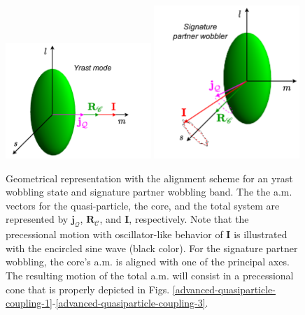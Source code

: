 \begin{figure}
    \centering
    \includegraphics[width=0.49\textwidth]{Chapters/Figures/yrast_wobbler-schematic.pdf}
    \includegraphics[width=0.49\textwidth]{Chapters/Figures/signaturePartner_wobbler-schematic.pdf}
    \caption{Geometrical representation with the alignment scheme for an yrast wobbling state and signature partner wobbling band. The the a.m. vectors for the quasi-particle, the core, and the total system are represented by $\mathbf{j}_\mathcal{Q}$, $\mathbf{R}_\mathscr{C}$, and $\mathbf{I}$, respectively. Note that the precessional motion with oscillator-like behavior of $\mathbf{I}$ is illustrated with the encircled sine wave (black color). For the signature partner wobbling, the core's a.m. is aligned with one of the principal axes. The resulting motion of the total a.m. will consist in a precessional cone that is properly depicted in Figs. \ref{advanced-quasiparticle-coupling-1}-\ref{advanced-quasiparticle-coupling-3}.}
    \label{wobbling-geometry-YRAST-SPB}
\end{figure}

